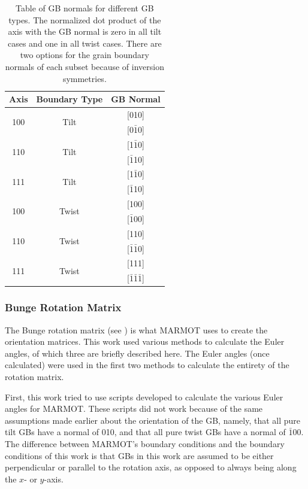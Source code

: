 \documentclass[twoside,senior]{BYUPhys}
\begin{document}
\begin{table}[ht!]
\centering
\caption{\label{table:geometricgbnorms}Table of GB normals for different GB types. The normalized dot product of the axis with the GB normal is zero in all tilt cases and one in all twist cases.  There are two options for the grain boundary normals of each subset because of inversion symmetries.}

\begin{tabular}{ccc}
Axis & Boundary Type & GB Normal \\
\hline
\hline
\multirow{2}{*}{\textlangle{}100\textrangle{}} & \multirow{2}{*}{Tilt} & [010] \\
                              & & [0$\bar{1}$0] \\
\hline
\multirow{2}{*}{\textlangle{}110\textrangle{}} & \multirow{2}{*}{Tilt} & [1$\bar{1}$0] \\
							  & & [$\bar{1}$10] \\
\hline
\multirow{2}{*}{\textlangle{}111\textrangle{}} & \multirow{2}{*}{Tilt} & [1$\bar{1}$0] \\
							  & & [$\bar{1}$10] \\
\hline
\multirow{2}{*}{\textlangle{}100\textrangle{}} & \multirow{2}{*}{Twist} & [100] \\
							  & & [$\bar{1}$00] \\
\hline
\multirow{2}{*}{\textlangle{}110\textrangle{}} & \multirow{2}{*}{Twist} & [110] \\
							  & & [$\bar{1}\bar{1}$0] \\
\hline
\multirow{2}{*}{\textlangle{}111\textrangle{}} & \multirow{2}{*}{Twist} & [111] \\
							  & & [$\bar{1}\bar{1}\bar{1}$] \\
\hline
\hline
\end{tabular}
\end{table}

\subsubsection{Bunge Rotation Matrix\label{PQ:BungeMat}}
The Bunge rotation matrix (see ) is what MARMOT uses to create the orientation matrices.  This work used various methods to calculate the Euler angles, of which three are briefly described here. The Euler angles (once calculated) were used in the first two methods to calculate the entirety of the rotation matrix.

First, this work tried to use scripts developed to calculate the various Euler angles for MARMOT.  These scripts did not work because of the same assumptions made earlier about the orientation of the GB, namely, that all pure tilt GBs have a normal of 010, and that all pure twist GBs have a normal of $\bar{1}$00.  The difference between MARMOT's boundary conditions and the boundary conditions of this work is that GBs in this work are assumed to be either perpendicular or parallel to the rotation axis, as opposed to always being along the $x$- or $y$-axis.
\end{document}
